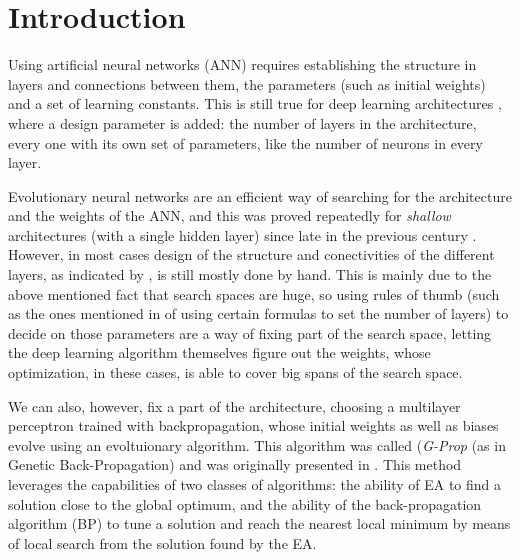 \documentclass[runningheads]{llncs}
\begin{document}
\section{Introduction}

Using artificial neural networks (ANN) requires establishing the
structure in layers and connections between them, the parameters (such
as initial weights) and a set of learning constants. This is still
true for deep learning architectures \cite{goodfellow,nielsen}, where
a design parameter is added: the number of layers in the architecture,
every one with its own set of parameters, like the number of neurons
in every layer.

Evolutionary neural networks are an efficient way of searching for the
architecture and the weights of the ANN, and this was proved
repeatedly for {\em shallow} architectures (with a single hidden
layer) since late in the previous century
\cite{CastilloNPL,stanley2002evolving}. However, in most cases design
of the structure and conectivities of the different layers, as
indicated by \cite{miikkulainen2019evolving}, is still mostly done by
hand. This is mainly due to the above mentioned fact that search
spaces are huge, so using rules of thumb (such as the ones mentioned
in \cite{qolomany2017parameters} of using certain formulas to set the
number of layers) to decide on those parameters
are a way of fixing part of the search space, letting the deep
learning algorithm themselves figure out the weights, whose
optimization, in these cases, is able to cover big spans of the search
space.

We can also, however, fix a part of the architecture, choosing a
multilayer perceptron trained with backpropagation, whose initial
weights as well as biases evolve using an evoltuionary algorithm. This
algorithm was called (\emph{G-Prop} (as in Genetic Back-Propagation)
and was originally presented in \cite{castilloNC,CastilloNPL}. This
method leverages the capabilities of two classes of algorithms: the
ability of EA to find a solution close to the global optimum, and the
ability of the back-propagation algorithm (BP) to tune a solution and
reach the nearest local minimum by means of local search from the
solution found by the EA.
\end{document}
